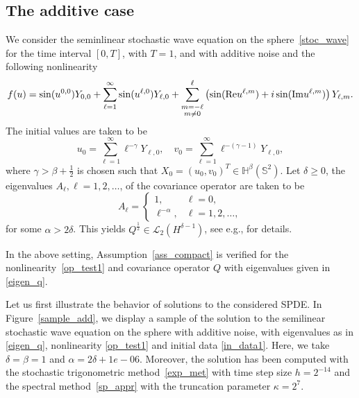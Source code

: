 \documentclass[a4paper]{amsart}
\theoremstyle{remark}
\theoremstyle{definition}
\newcommand{\HH}{\mathbb{H}}
\begin{document}
\subsection{The additive case}
We consider the seminlinear stochastic wave equation on the sphere~\eqref{stoc_wave} for the time interval $[0,T]$, with $T=1$, and with additive noise and the following nonlinearity 
\begin{equation}
\label{op_test1}
f(u)=\sin(u^{0,0})Y_{0,0}+\sum_{\ell=1}^{\infty}\sin(u^{\ell,0})Y_{\ell,0}+\sum_{\substack{m=-\ell\\ m\ne 0}}^{\ell}\left(\sin({\rm Re}u^{\ell,m})+i \sin({\rm Im}u^{\ell,m})\right)Y_{\ell,m}.
\end{equation}
The initial values are taken to be 
\begin{equation}
\label{in_data1}
u_0=\sum_{\ell=1}^{\infty}\ell^{-\gamma}Y_{\ell,0}, \quad v_0=\sum_{\ell=1}^{\infty}\ell^{-(\gamma-1)}Y_{\ell,0},
\end{equation}
where $\gamma>\beta+\frac12$ is chosen such that $X_0=(u_0, v_0)^T\in \HH^{\beta}(\mathbb{S}^2)$. 
Let $\delta\geq0$, the eigenvalues $A_{\ell}, \ell=1,2,\dots$, of the covariance operator are taken to be 
\begin{equation}
\label{eigen_q}
A_\ell=\begin{cases}
    1,& \ell=0,\\
    \ell^{-\alpha}, & \ell=1,2,\dots,
\end{cases}
\end{equation}
for some $\alpha>2\delta$. This yields $Q^{\frac{1}{2}}\in\mathcal{L}_2(H^{\delta-1})$, see e.g., \cite{lang2025approximationlevydrivenstochasticheat} for details. 

In the above setting, Assumption~\ref{ass_compact} is verified for the nonlinearity~\eqref{op_test1} and covariance operator $Q$ with eigenvalues given in \eqref{eigen_q}. 

Let us first illustrate the behavior of solutions to the considered SPDE. In Figure~\ref{sample_add}, we display a sample of the solution to the semilinear  stochastic wave equation on the sphere with additive noise, with eigenvalues as in \eqref{eigen_q}, nonlinearity \eqref{op_test1} and initial data \eqref{in_data1}. Here, we take $\delta=\beta=1$ and $\alpha=2\delta+1e-06$. Moreover, the solution has been computed with the stochastic trigonometric method~\eqref{exp_met} with  time step size $h=2^{-14}$ and the spectral method~\eqref{sp_appr} with the truncation parameter $\kappa=2^7$.
\end{document}
